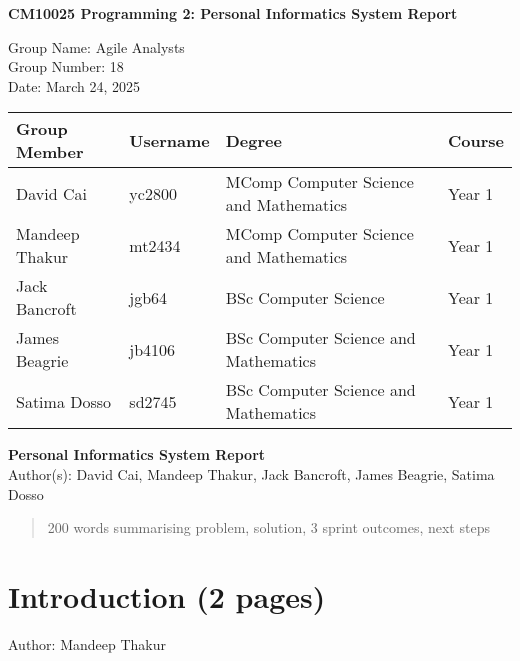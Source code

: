 \documentclass[12pt,a4paper]{article}
\begin{document}
\begin{titlepage}
    \centering
    {\Large\bfseries CM10025 Programming 2: Personal Informatics System Report\par}
    \vspace{1cm}
    Group Name: Agile Analysts \\
    Group Number: 18 \\
    Date: March 24, 2025

    \vspace{2cm}
    \begin{tabular}{llll}
        \toprule
        Group Member & Username & Degree & Course \\
        \midrule
        David Cai & yc2800 & MComp Computer Science and Mathematics & Year 1 \\
        Mandeep Thakur & mt2434 &  MComp Computer Science and Mathematics & Year 1\\
        Jack Bancroft & jgb64 & BSc Computer Science & Year 1\\
        James Beagrie & jb4106 & BSc Computer Science and Mathematics & Year 1\\
        Satima Dosso & sd2745 & BSc Computer Science and Mathematics & Year 1 \\
    \end{tabular}
    \thispagestyle{empty}
\end{titlepage}

\begin{center}
    {\Large\bfseries Personal Informatics System Report}\\[1ex]
    Author(s): David Cai, Mandeep Thakur, Jack Bancroft, James Beagrie, Satima Dosso
\end{center}
\begin{abstract}
    200 words summarising problem, solution, 3 sprint outcomes, next steps
    
\end{abstract}
\newpage

\tableofcontents
\newpage




\section{Introduction (2 pages)}
Author: Mandeep Thakur
\end{document}
